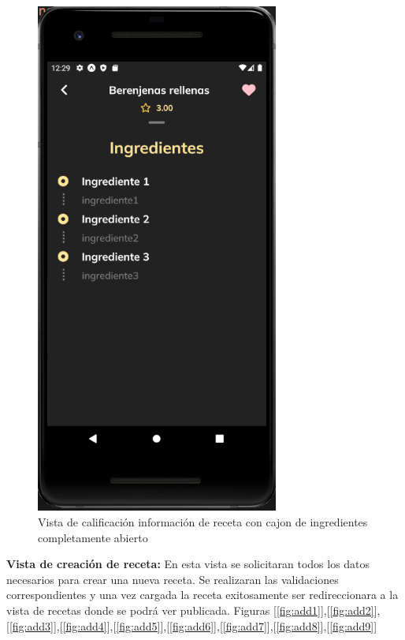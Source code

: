 \begin{figure}[!h]
  \centering
  \includegraphics[width=8cm, scale=1]{Images/Imagenes/inforeceta4.png}
  \caption{Vista de calificación información de receta con cajon de ingredientes completamente abierto}
  \label{fig:inforeceta4}
\end{figure}

\textbf{Vista de creación de receta: }
En esta vista se solicitaran todos los datos necesarios para crear una nueva receta. Se realizaran las validaciones correspondientes y una vez cargada la receta exitosamente ser redireccionara a la vista de recetas donde se podrá ver publicada. Figuras [\ref{fig:add1}],[\ref{fig:add2}],[\ref{fig:add3}],[\ref{fig:add4}],[\ref{fig:add5}],[\ref{fig:add6}],[\ref{fig:add7}],[\ref{fig:add8}],[\ref{fig:add9}]\\

